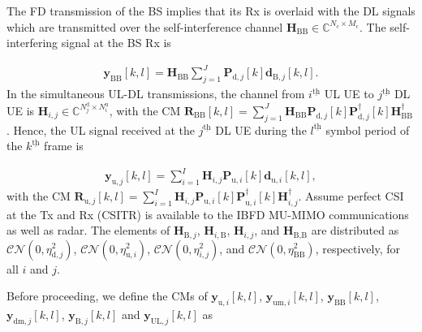 \documentclass[10pt,journal]{IEEEtran}
\newcommand{\paren}[1]{\left({#1}\right)}
\newcommand{\bracket}[1]{{\left [{#1}\right ]}}
\newcommand{\braces}[1]{{\left\{ {#1}\right\}}}
\newcommand{\ith}[1]    {{#1}^{\underline{\text{th}}}}
\newcommand{\cc}{_\mathrm{c}}
\newcommand{\dui}{\mathbf{d}_{\textrm{u},i}\bracket{k,l}}
\newcommand{\PiB}{\mathbf{P}_{\textrm{u},i}\bracket{k}}
\newcommand{\PiBH}{\mathbf{P}^\dagger_{\textrm{u},i}\bracket{k}}
\newcommand{\PBj}{\mathbf{P}_{\textrm{d},j}\bracket{k}}
\newcommand{\PBjH}{\mathbf{P}^\dagger_{\textrm{d},j}\bracket{k}}
\theoremstyle{definition}
\begin{document}
The FD transmission of the BS implies that its Rx is overlaid with the DL signals which are transmitted over the self-interference channel $\mathbf{H}_{\mathrm{BB}}\in{\mathbb{C}^{\mathit{N}\cc\times \mathit{M}\cc}}$. The self-interfering signal at the BS Rx is\par\noindent\small \begin{align}
\mathbf{y}_{\mathrm{BB}}\bracket{k,l}=\mathbf{H}_{\mathrm{BB}}\sum_{j=1}^{\mathit{J}}\PBj\mathbf{d}_{\textrm{B},j}\bracket{k,l}. \label{eq:sic}
\end{align}\normalsize
In the simultaneous UL-DL transmissions, the channel from $\ith{i}$ UL UE to $\ith{j}$ DL UE is $\mathbf{H}_{i,j}\in\mathbb{C}^{\mathit{N}^{\textrm{d}}_j\times \mathit{N}^{\textrm{u}}_i}$, with the CM $\mathbf{R}_{\mathrm{BB}}\bracket{k,l}=\sum_{j=1}^{\mathit{J}}\mathbf{H}_{\mathrm{BB}}\PBj\PBjH\mathbf{H}^\dagger_\mathrm{BB}$.
Hence, the UL signal received at the $\ith{j}$ DL UE during the $\ith{l}$ symbol period of the $\ith{k}$ frame is\par\noindent\small
\begin{align}
\mathbf{y}_{\mathrm{u},j}\bracket{k,l}=\sum_{i=1}^{\mathit{I}}\mathbf{H}_{i,j}\PiB\dui,\label{eq:UL2}
\end{align}\normalsize
with the CM $\mathbf{R}_{\mathrm{u},j}\bracket{k,l}=\sum_{i=1}^{\mathit{I}}\mathbf{H}_{i,j}\PiB\PiBH\mathbf{H}^\dagger_{i,j}$. Assume perfect CSI at the Tx and Rx (CSITR) is available to the IBFD MU-MIMO communications as well as radar. The elements of $\mathbf{H}_{\textrm{B},j}$, $\mathbf{H}_{i,\textrm{B}}$, $\mathbf{H}_{i,j}$, and $\mathbf{H}_{\textrm{B,B}}$ are distributed as $\mathcal{CN}\paren{0,\eta^2_{\textrm{d},j}}$, $\mathcal{CN}\paren{0,\eta^2_{\textrm{u},i}}$, $\mathcal{CN}\paren{0,\eta^2_{i,j}}$, and $\mathcal{CN}\paren{0,\eta^2_{\textrm{BB}}}$, respectively, for all $i$ and $j$.

\iffalse
Before proceeding, we define the CMs of $\mathbf{y}_{\textrm{u},i}\bracket{k,l}$, $\mathbf{y}_{\textrm{um},i}\bracket{k,l}$, $\mathbf{y}_{\mathrm{BB}}\bracket{k,l}$, $\mathbf{y}_{\textrm{dm},j}\bracket{k,l}$, $\mathbf{y}_{\textrm{B},j}\bracket{k,l}$ and $\mathbf{y}_{\textrm{UL},j}\bracket{k,l}$ as 
\par\noindent\small
\end{document}
